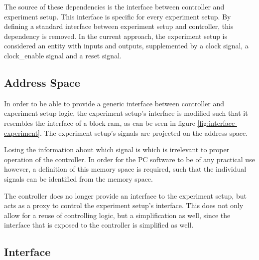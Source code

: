 \documentclass[openright]{template/uva-bachelor-thesis}
\begin{document}
The source of these dependencies is the interface between controller and experiment setup. This interface is specific for every experiment setup. By defining a standard interface between experiment setup and controller, this dependency is removed. In the current approach, the experiment setup is considered an entity with inputs and outputs, supplemented by a clock signal, a clock\_enable signal and a reset signal. 

\subsection{Address Space}
In order to be able to provide a generic interface between controller and experiment setup logic, the experiment setup's interface is modified such that it resembles the interface of a block ram, as can be seen in figure \ref{fig:interface-experiment}. The experiment setup's signals are projected on the address space. 

Losing the information about which signal is which is irrelevant to proper operation of the controller. In order for the PC software to be of any practical use however, a definition of this memory space is required, such that the individual signals can be identified from the memory space. 

The controller does no longer provide an interface to the experiment setup, but acts as a proxy to control the experiment setup's interface. This does not only allow for a reuse of controlling logic, but a simplification as well, since the interface that is exposed to the controller is simplified as well.

\subsection{Interface}
\end{document}
